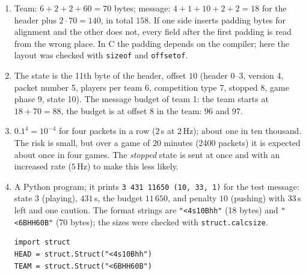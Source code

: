 \begin{enumerate}[label=\textbf{\ansnum.\arabic*}]
  \item Team: $6+2+2+60=70$ bytes; message: $4+1+10+2+2=18$ for the header plus $2\cdot70=140$, in total $158$. If one side inserts padding bytes for alignment and the other does not, every field after the first padding is read from the wrong place. In C the padding depends on the compiler; here the layout was checked with \verb!sizeof! and \verb!offsetof!.
  \item The state is the 11th byte of the header, offset $10$ (header 0--3, version 4, packet number 5, players per team 6, competition type 7, stopped 8, game phase 9, state 10). The message budget of team 1: the team starts at $18+70=88$, the budget is at offset $8$ in the team: $96$ and $97$.
  \item $0.1^{4}=10^{-4}$ for four packets in a row ($2$\,s at $2$\,Hz); about one in ten thousand. The risk is small, but over a game of $20$ minutes (2400 packets) it is expected about once in four games. The \emph{stopped} state is sent at once and with an increased rate ($5$\,Hz) to make this less likely.
  \item A Python program; it prints \verb!3 431 11650 (10, 33, 1)! for the test message: state $3$ (playing), $431$\,s, the budget $11\,650$, and penalty $10$ (pushing) with $33$\,s left and one caution. The format strings are \verb!"<4s10Bhh"! (18 bytes) and \verb!"<6BHH60B"! (70 bytes); the sizes were checked with \verb!struct.calcsize!.
\begin{verbatim}
import struct
HEAD = struct.Struct("<4s10Bhh")
TEAM = struct.Struct("<6BHH60B")


\end{verbatim}
\end{enumerate}
